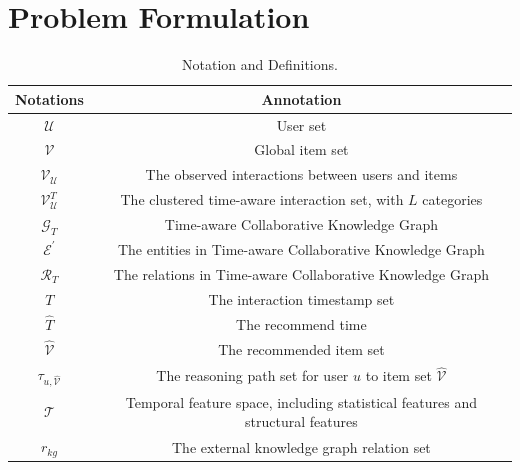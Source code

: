 \section{Problem Formulation}\label{sec2}

%

\begin{table}[t!] 
    \centering
    \caption{Notation and Definitions.}
\begin{tabular}{cc} 
\toprule
\textbf{Notations} & \textbf{Annotation} \\ \hline
$\mathcal{U}$                  & User set                \\
$\mathcal{V}$                  & Global item set                \\ 
$\mathcal{V}_\mathcal{U}$      & The observed interactions between users and items  \\
$\mathcal{V}_\mathcal{U}^T$     & The clustered time-aware interaction set, with $L$ categories \\
$\mathcal{G}_T$                 & Time-aware Collaborative Knowledge Graph \\
$\mathcal{E}^{\prime}$          & The entities in Time-aware Collaborative Knowledge Graph \\
$\mathcal{R}_T$                 & The relations in Time-aware Collaborative Knowledge Graph \\
$T$                             & The interaction timestamp set \\
$\hat{T}$                       & The recommend time \\
$\hat{\mathcal{V}}$             & The recommended item set \\
$\tau_{u, \hat{\mathcal{V}}}$   & The reasoning path set for user $u$ to  item set $\hat{\mathcal{V}}$ \\
$\mathcal{T}$                & Temporal feature space, including statistical features and structural features \\
$r_{kg}$                        & The  external knowledge graph relation set \\

\end{tabular}
\end{table}
